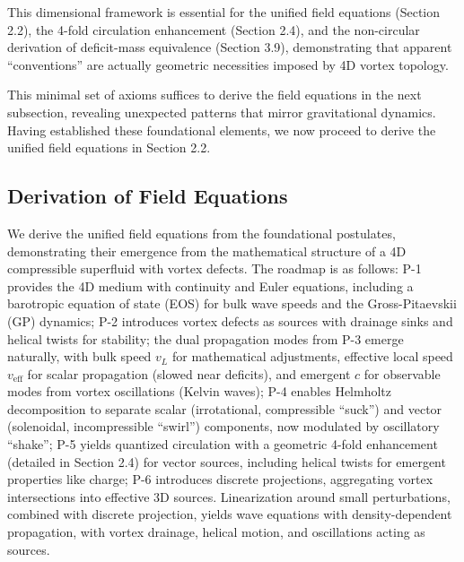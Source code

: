 This dimensional framework is essential for the unified field equations (Section 2.2), the 4-fold circulation enhancement (Section 2.4), and the non-circular derivation of deficit-mass equivalence (Section 3.9), demonstrating that apparent ``conventions'' are actually geometric necessities imposed by 4D vortex topology.

This minimal set of axioms suffices to derive the field equations in the next subsection, revealing unexpected patterns that mirror gravitational dynamics. Having established these foundational elements, we now proceed to derive the unified field equations in Section 2.2.

\medskip
\noindent
{}
\medskip

\subsection{Derivation of Field Equations}

We derive the unified field equations from the foundational postulates, demonstrating their emergence from the mathematical structure of a 4D compressible superfluid with vortex defects. The roadmap is as follows: P-1 provides the 4D medium with continuity and Euler equations, including a barotropic equation of state (EOS) for bulk wave speeds and the Gross-Pitaevskii (GP) dynamics; P-2 introduces vortex defects as sources with drainage sinks and helical twists for stability; the dual propagation modes from P-3 emerge naturally, with bulk speed $v_L$ for mathematical adjustments, effective local speed $v_{\text{eff}}$ for scalar propagation (slowed near deficits), and emergent $c$ for observable modes from vortex oscillations (Kelvin waves); P-4 enables Helmholtz decomposition to separate scalar (irrotational, compressible ``suck'') and vector (solenoidal, incompressible ``swirl'') components, now modulated by oscillatory ``shake''; P-5 yields quantized circulation with a geometric 4-fold enhancement (detailed in Section 2.4) for vector sources, including helical twists for emergent properties like charge; P-6 introduces discrete projections, aggregating vortex intersections into effective 3D sources. Linearization around small perturbations, combined with discrete projection, yields wave equations with density-dependent propagation, with vortex drainage, helical motion, and oscillations acting as sources.

